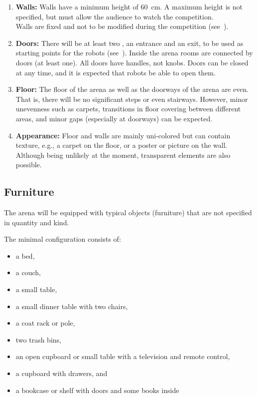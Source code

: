 \begin{enumerate}
	\item \textbf{Walls:} Walls have a minimum height of \SI{60}{\centi\meter}. A maximum height is not specified, but must allow the audience to watch the competition.\\
	Walls are fixed and not to be modified during the competition (see~).

	\item \textbf{Doors:} There will be at least two , an entrance and an exit, to be used as starting points for the robots (see~).
	Inside the arena rooms are connected by doors (at least one).
	All doors have handles, not knobs.
	Doors can be closed at any time, and it is expected that robots be able to open them.

	\item \textbf{Floor:} The floor of the arena as well as the doorways of the arena are even.
	That is, there will be no significant steps or even stairways.
	However, minor unevenness such as carpets, transitions in floor covering between different areas, and minor gaps (especially at doorways) can be expected.

	\item \textbf{Appearance:} Floor and walls are mainly uni-colored but can contain texture, e.g., a carpet on the floor, or a poster or picture on the wall.\\
	Although being unlikely at the moment, transparent elements are also possible.
\end{enumerate}


\subsection{Furniture}
\label{rule:scenario_furniture}
The arena will be equipped with typical objects (furniture) that are not specified in quantity and kind.

The minimal configuration consists of:
\begin{itemize}
	\item a bed,
	\item a couch,
	\item a small table,
	\item a small dinner table with two chairs,
	\item a coat rack or pole,
	\item two trash bins,
	\item an open cupboard or small table with a television and remote control,
	\item a cupboard with drawers, and
	\item a bookcase or shelf with doors and some books inside
\end{itemize}

